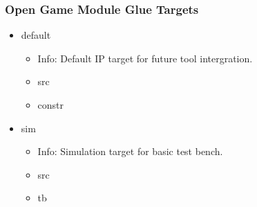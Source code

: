\subsubsection{Open Game Module Glue Targets}
\begin{itemize}
\item default
	\begin{itemize}
	\item[$\space$] Info: Default IP target for future tool intergration.
	\item src
	\item constr
	\end{itemize}
\item sim
	\begin{itemize}
	\item[$\space$] Info: Simulation target for basic test bench.
	\item src
	\item tb
	\end{itemize}
\end{itemize}

